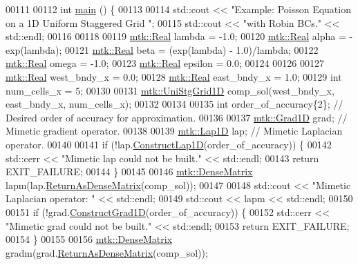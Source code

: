 \begin{DoxyCode}
00111 
00112 \textcolor{keywordtype}{int} \hyperlink{poisson__1d_8cc_ae66f6b31b5ad750f1fe042a706a4e3d4}{main} () \{
00113 
00114   std::cout << \textcolor{stringliteral}{"Example: Poisson Equation on a 1D Uniform Staggered Grid "};
00115   std::cout << \textcolor{stringliteral}{"with Robin BCs."} << std::endl;
00116 
00118 
00119   \hyperlink{group__c01-roots_gac080bbbf5cbb5502c9f00405f894857d}{mtk::Real} lambda = -1.0;
00120   \hyperlink{group__c01-roots_gac080bbbf5cbb5502c9f00405f894857d}{mtk::Real} alpha = -exp(lambda);
00121   \hyperlink{group__c01-roots_gac080bbbf5cbb5502c9f00405f894857d}{mtk::Real} beta = (exp(lambda) - 1.0)/lambda;
00122   \hyperlink{group__c01-roots_gac080bbbf5cbb5502c9f00405f894857d}{mtk::Real} omega = -1.0;
00123   \hyperlink{group__c01-roots_gac080bbbf5cbb5502c9f00405f894857d}{mtk::Real} epsilon = 0.0;
00124 
00126 
00127   \hyperlink{group__c01-roots_gac080bbbf5cbb5502c9f00405f894857d}{mtk::Real} west\_bndy\_x = 0.0;
00128   \hyperlink{group__c01-roots_gac080bbbf5cbb5502c9f00405f894857d}{mtk::Real} east\_bndy\_x = 1.0;
00129   \textcolor{keywordtype}{int} num\_cells\_x = 5;
00130 
00131   \hyperlink{classmtk_1_1UniStgGrid1D}{mtk::UniStgGrid1D} comp\_sol(west\_bndy\_x, east\_bndy\_x, num\_cells\_x);
00132 
00134 
00135   \textcolor{keywordtype}{int} order\_of\_accuracy\{2\};  \textcolor{comment}{// Desired order of accuracy for approximation.}
00136 
00137   \hyperlink{classmtk_1_1Grad1D}{mtk::Grad1D} grad;  \textcolor{comment}{// Mimetic gradient operator.}
00138 
00139   \hyperlink{classmtk_1_1Lap1D}{mtk::Lap1D} lap;  \textcolor{comment}{// Mimetic Laplacian operator.}
00140 
00141   \textcolor{keywordflow}{if} (!lap.\hyperlink{classmtk_1_1Lap1D_a685dcba88c08cf5b7b6c2aa4669a472c}{ConstructLap1D}(order\_of\_accuracy)) \{
00142     std::cerr << \textcolor{stringliteral}{"Mimetic lap could not be built."} << std::endl;
00143     \textcolor{keywordflow}{return} EXIT\_FAILURE;
00144   \}
00145 
00146   \hyperlink{classmtk_1_1DenseMatrix}{mtk::DenseMatrix} lapm(lap.\hyperlink{classmtk_1_1Lap1D_a28672c735fa0d13e6204795b63aec4e2}{ReturnAsDenseMatrix}(comp\_sol));
00147 
00148   std::cout << \textcolor{stringliteral}{"Mimetic Laplacian operator: "} << std::endl;
00149   std::cout << lapm << std::endl;
00150 
00151   \textcolor{keywordflow}{if} (!grad.\hyperlink{classmtk_1_1Grad1D_a74ef5245cfae6fd158bd7f563a0c2e52}{ConstructGrad1D}(order\_of\_accuracy)) \{
00152     std::cerr << \textcolor{stringliteral}{"Mimetic grad could not be built."} << std::endl;
00153     \textcolor{keywordflow}{return} EXIT\_FAILURE;
00154   \}
00155 
00156   \hyperlink{classmtk_1_1DenseMatrix}{mtk::DenseMatrix} gradm(grad.\hyperlink{classmtk_1_1Grad1D_a4218516bfb43f683559322ea97058c78}{ReturnAsDenseMatrix}(comp\_sol));

\end{DoxyCode}
